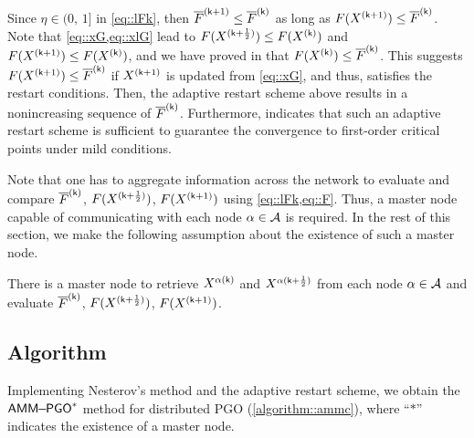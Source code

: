 \begin{remark}
Since $\eta\in(0,\,1]$ in \cref{eq::lFk}, then $\sF^{(\skp)}\leq \sF^{(\sk)}$ as long as $F(\Xkp)\leq \sF^{(\sk)}$.  Note that \cref{eq::xG,eq::xlG} lead to $F(\Xkh)\leq F(\Xk)$ and $F(\Xkp)\leq F(\Xk)$, and  we have proved in  that $F(\Xk)\leq \sF^{(\sk)}$. This  suggests $F(\Xkp)\leq \sF^{(\sk)}$ if $\Xkp$ is updated from \cref{eq::xG}, and thus, satisfies the restart conditions. Then,  the adaptive restart scheme above results in a nonincreasing sequence of $\sF^{(\sk)}$.  Furthermore,   indicates that such an adaptive restart scheme is sufficient to guarantee the convergence to first-order critical points under mild conditions.
\end{remark}


Note that one has to aggregate information across the network to evaluate and compare $\sF^{(\sk)}$, $F(\Xkh)$, $F(\Xkp)$ using \cref{eq::lFk,eq::F}. Thus, a master node capable of communicating with each node $\alpha\in\AA$ is required. In the rest of this section, we make the following assumption about the existence of such a master node.

\begin{assumption}\label{assumption::master}
	There is a master node to retrieve $\Xak$ and $\Xakh$ from each node $\alpha\in\AA$ and evaluate $\sF^{(\sk)}$, $F(\Xkh)$, $F(\Xkp)$.  
\end{assumption}

\subsection{Algorithm}\label{section::ammc::algorithm}



Implementing Nesterov's method  and the adaptive restart scheme, we obtain the $\ammc$ method for distributed PGO (\cref{algorithm::ammc}), where ``$*$'' indicates  the existence of a master node. 

